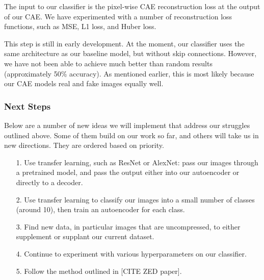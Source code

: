 \documentclass{article} %
\begin{document}
The input to our classifier is the pixel-wise CAE reconstruction loss at the output of our CAE. We have experimented with a number of reconstruction loss functions, such as MSE, L1 loss, and Huber loss.

This step is still in early development. At the moment, our classifier uses the same architecture as our baseline model, but without skip connections. However, we have not been able to achieve much better than random results (approximately 50\% accuracy). As mentioned earlier, this is most likely because our CAE models real and fake images equally well.

\subsubsection{Next Steps}
\label{next_steps}

Below are a number of new ideas we will implement that address our struggles outlined above. Some of them build on our work so far, and others will take us in new directions. They are ordered based on priority.

\begin{itemize}
    \item[1.] Use transfer learning, such as ResNet or AlexNet: pass our images through a pretrained model, and pass the output either into our autoencoder or directly to a decoder.
    \item[2.] Use transfer learning to classify our images into a small number of classes (around 10), then train an autoencoder for each class. 
    \item[3.] Find new data, in particular images that are uncompressed, to either supplement or supplant our current dataset.
    \item[4.] Continue to experiment with various hyperparameters on our classifier.
    \item[5.] Follow the method outlined in [CITE ZED paper].
\end{itemize}

\label{last_page}



\end{document}
